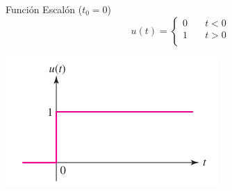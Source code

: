 \documentclass[xcolor={usenames,svgnames,dvipsnames}]{beamer}
\begin{document}
\begin{frame}[label={sec:org14585dc}]{Función Escalón (\(t_0 = 0\))}
\[   
u(t) = 
     \begin{cases}
       0 &\quad t < 0\\
       1 &\quad t > 0\\
     \end{cases}
\]

\begin{center}
\includegraphics[width=.9\linewidth]{../figs/funcion_escalon0.pdf}
\end{center}
\end{frame}
\end{document}
